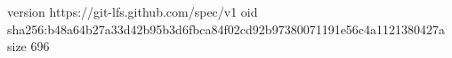 version https://git-lfs.github.com/spec/v1
oid sha256:b48a64b27a33d42b95b3d6fbca84f02cd92b97380071191e56c4a1121380427a
size 696
